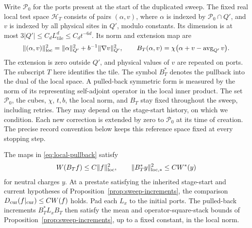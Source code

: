 Write \(\mathcal P_0\) for the ports present at the start of the
duplicated sweep.  The fixed real local test space \(\mathcal H_T\)
consists of pairs \((\alpha,v)\), where \(\alpha\) is indexed by
\(\mathcal P_0\cap Q'\), and \(v\) is indexed by all physical sites
in \(Q'\), modulo constants.  Its dimension is at most
\(3|Q'|\le C_d L_{\mathrm{tile}}^d\le C_d t^{-6d}\).
Its norm and extension map are
\begin{equation}\label{eq:local-pullback}
 \| (\alpha,v)\|_{\rm loc}^2
   =\|\alpha\|_{Q'}^2+b^{-1}\|\nabla v\|_{Q'}^2,
 \qquad
 B_T(\alpha,v)=\chi\big(\alpha+v-\operatorname{avg}_{Q'}v\big).
\end{equation}
The extension is zero outside \(Q'\), and physical values of \(v\) are
repeated on ports.  The subscript \(T\) here identifies the tile.
The symbol \(B_T^*\) denotes the pullback into the dual of the local
space.  A pulled-back symmetric form is measured by the norm of its
representing self-adjoint operator in the local inner product.
The set \(\mathcal P_0\), the cubes, \(\chi\), \(t,b\), the local
norm, and \(B_T\) stay fixed throughout the sweep, including retries.
They may depend on the stage-start history, on which we condition.
Each new correction is extended by zero to \(\mathcal P_0\) at its
time of creation.  The precise record convention below keeps this
reference space fixed at every stopping step.

\begin{lemma}\label{lem:local-pullback}
The maps in \eqref{eq:local-pullback} satisfy
\[
 W(B_Tf)\le C\|f\|_{\rm loc}^2,
 \qquad
 \|B_T^*y\|_{{\rm loc},*}^2\le CW^*(y)
\]
for neutral charges \(y\).  At a prestate satisfying the inherited
stage-start and current hypotheses of Proposition~\ref{prop:sweep-increments},
the comparison \(D_{\rm cur}(f|_{\rm cur})\le CW(f)\) holds.  Pad each \(L_x\) to the
initial ports.  The pulled-back increments \(B_T^*L_xB_T\) then satisfy the
mean and operator-square-stack bounds of
Proposition~\ref{prop:sweep-increments}, up to a fixed constant, in
the local norm.
\end{lemma}

